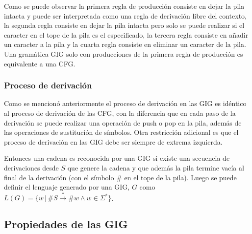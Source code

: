 \documentclass{article}
\begin{document}
Como se puede observar la primera regla de producción consiste en dejar la pila intacta y puede ser interpretada como una regla de derivación
libre del contexto, la segunda regla consiste en dejar la pila intacta pero solo se puede realizar si el caracter en el tope de la pila es el
especificado, la tercera regla consiste en añadir un caracter a la pila y la cuarta regla consiste en eliminar un caracter de la pila.
Una gramática GIG solo con producciones de la primera regla de producción es equivalente a una CFG.

\subsubsection{Proceso de derivación}

Como se mencionó anteriormente el proceso de derivación en las GIG es idéntico al proceso de derivación de las CFG, con la diferencia que
en cada paso de la derivación se puede realizar una operación de push o pop en la pila, además de las operaciones de sustitución de símbolos.
Otra restricción adicional es que el proceso de derivación en las GIG debe ser siempre de extrema izquierda.

Entonces una cadena es reconocida por una GIG si existe una secuencia de derivaciones desde $S$ que genere la cadena y que además la pila
termine vacía al final de la derivación (con el símbolo $\#$ en el tope de la pila). Luego se puede definir el lenguaje generado por una GIG, $G$
como $L(G)=\{w\,|\,\#S\overset{*}{\to}\#w \wedge w\in \Sigma^* \}$.

\subsection{Propiedades de las GIG}
\end{document}
